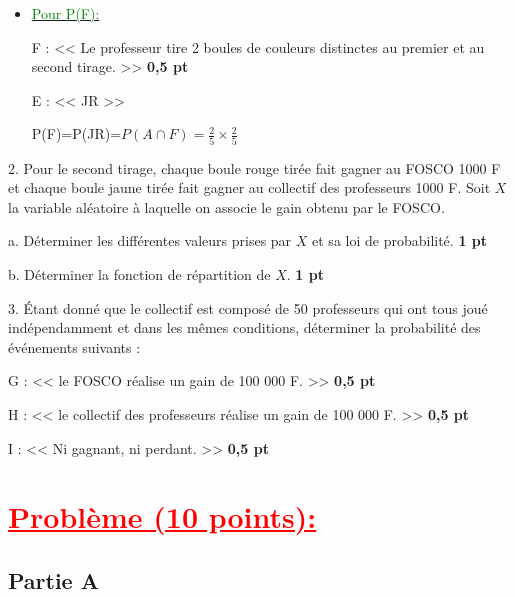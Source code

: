 \documentclass[12pt]{article}
\begin{document}
\begin{itemize}
\item \underline{\textcolor{green}{Pour P(F):}}

F : << Le professeur tire 2 boules de couleurs distinctes au premier et au second tirage. >> \textbf{0,5 pt}

E : << JR >>

P(F)=P(JR)=$P(A\cap F)=\frac{2}{5}\times \frac{2}{5}$

		\begin{center}
			\textcolor{green}{}
		\end{center}
\end{itemize}
2. Pour le second tirage, chaque boule rouge tirée fait gagner au FOSCO 1000 F et chaque boule jaune tirée fait gagner au collectif des professeurs 1000 F.
Soit \(X\) la variable aléatoire à laquelle on associe le gain obtenu par le FOSCO.

a. Déterminer les différentes valeurs prises par \(X\) et sa loi de probabilité. \textbf{1 pt}

b. Déterminer la fonction de répartition de \(X\). \textbf{1 pt}

3. Étant donné que le collectif est composé de 50 professeurs qui ont tous joué indépendamment et dans les mêmes conditions, déterminer la probabilité des événements suivants :

G : << le FOSCO réalise un gain de 100 000 F. >> \textbf{0,5 pt}

H : << le collectif des professeurs réalise un gain de 100 000 F. >> \textbf{0,5 pt}

I : << Ni gagnant, ni perdant. >> \textbf{0,5 pt}
\section*{\textcolor{red}{\underline{Problème (10 points):}}}

\subsection*{\centering Partie A}
\end{document}
